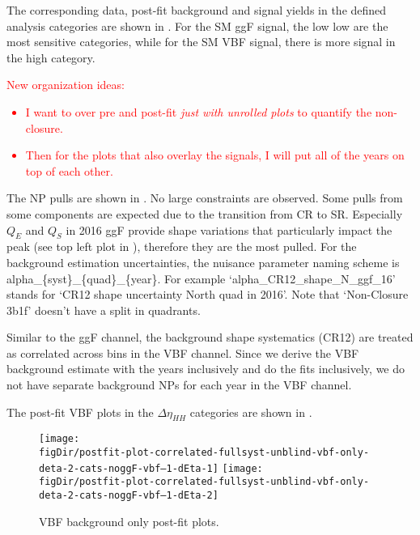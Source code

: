 The corresponding data, post-fit background and signal yields in the defined analysis categories are shown in \Tab{\ref{tab:yields}}. For the SM ggF signal, the low \Xhh low \deta are the most sensitive categories, while for the SM VBF signal, there is more signal in the high \deta category.



\textcolor{red}{
New organization ideas: 
\begin{itemize}
\item I want to over pre and post-fit \emph{just with unrolled plots} to quantify the non-closure.
\item Then for the plots that also overlay the signals, I will put all of the years on top of each other.
\end{itemize}
}

The NP pulls are shown in \Fig{\ref{fig:ggf-pulls-corr-bonly}}.
No large constraints are observed.
Some pulls from some components are expected due to the transition from CR to SR.
Especially $Q_E$ and $Q_S$ in 2016 ggF provide shape variations that particularly impact the \mhh peak (see top left plot in \Fig{\ref{fig:sr-np-impact-by-cat}}), therefore they are the most pulled.
For the background estimation uncertainties, the nuisance parameter naming scheme is alpha\_\{syst\}\_\{quad\}\_\{year\}.
For example `alpha\_CR12\_shape\_N\_ggf\_16' stands for `CR12 shape uncertainty North quad in 2016'.
Note that `Non-Closure 3b1f' doesn't have a split in quadrants.


Similar to the ggF channel, the background shape systematics (CR12) are treated as correlated across \deta bins in the VBF channel.
Since we derive the VBF background estimate with the years inclusively and do the fits inclusively, we do not have separate background NPs for each year in the VBF channel.

The post-fit VBF plots in the $\Delta \eta_{HH}$ categories are shown in \Fig{\ref{fig:vbf-postfit}}.

\begin{figure}[htp]
\centering
	\texttt{[image: \\figDir/postfit-plot-correlated-fullsyst-unblind-vbf-only-deta-2-cats-noggF-vbf--1-dEta-1]} 
	\texttt{[image: \\figDir/postfit-plot-correlated-fullsyst-unblind-vbf-only-deta-2-cats-noggF-vbf--1-dEta-2]} 
	\caption{VBF background only post-fit plots.}
	\label{fig:vbf-postfit}
\end{figure}

